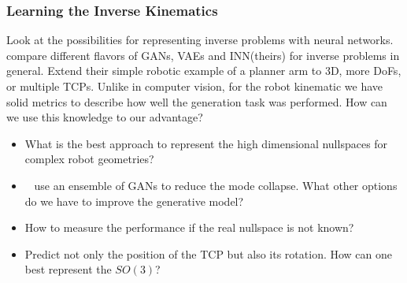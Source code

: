 \documentclass[a4paper]{article}
\begin{document}


\subsubsection{Learning the Inverse Kinematics}
Look at the possibilities for representing inverse problems with neural networks.
~\citet{Ardizzone2018inverse} compare different flavors of GANs, VAEs and INN(theirs) for inverse problems in general.
Extend their simple robotic example of a planner arm to 3D, more DoFs, or multiple TCPs.
Unlike in computer vision, for the robot kinematic we have solid metrics to describe how well the generation task was performed.
How can we use this knowledge to our advantage?
\begin{itemize}
  \item What is the best approach to represent the high dimensional nullspaces for complex robot geometries?
  \item ~\citet{Lembono2021GAN} use an ensemble of GANs to reduce the mode collapse.
        What other options do we have to improve the generative model?
  \item How to measure the performance if the real nullspace is not known?
  \item Predict not only the position of the TCP but also its rotation.
        How can one best represent the $SO(3)$?
\end{itemize}
\end{document}
